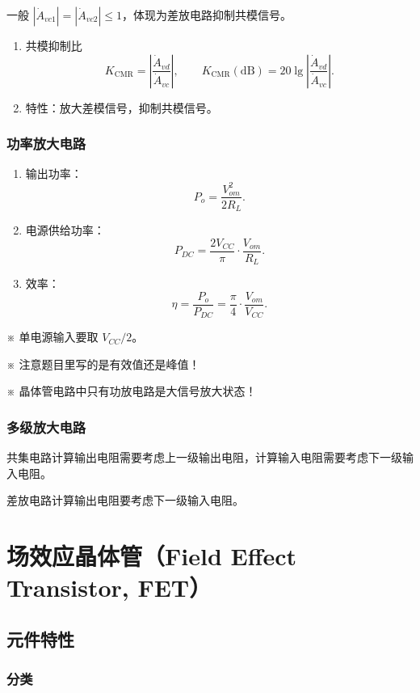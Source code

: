 \documentclass[UTF8,fontset=fandol,zihao=5]{ctexart}
\begin{document}
一般 $|\dot A_{vc1}|=|\dot A_{vc2}|\leq1$，体现为差放电路抑制共模信号。

\begin{enumerate}[resume]
  \item 共模抑制比
  \[
    K_{\mathrm{CMR}}=\left|\frac{\dot A_{vd}}{\dot A_{vc}}\right|,
    \qquad
    K_{\mathrm{CMR}}(\mathrm{dB})=20\lg\left|\frac{\dot A_{vd}}{\dot A_{vc}}\right|.
  \]
  \item 特性：放大差模信号，抑制共模信号。
\end{enumerate}

\subsubsection{功率放大电路}

\begin{enumerate}
  \item 输出功率：
  \[
    P_o=\frac{V_{om}^2}{2R_L}.
  \]
  \item 电源供给功率：
  \[
    P_{DC}=\frac{2V_{CC}}{\pi}\cdot\frac{V_{om}}{R_L}.
  \]
  \item 效率：
  \[
    \eta=\frac{P_o}{P_{DC}}=\frac{\pi}{4}\cdot\frac{V_{om}}{V_{CC}}.
  \]
\end{enumerate}

※ 单电源输入要取 $V_{CC}/2$。

※ 注意题目里写的是有效值还是峰值！

※ 晶体管电路中只有功放电路是大信号放大状态！

\subsubsection{多级放大电路}

共集电路计算输出电阻需要考虑上一级输出电阻，计算输入电阻需要考虑下一级输入电阻。

差放电路计算输出电阻要考虑下一级输入电阻。

\section{场效应晶体管（Field Effect Transistor, FET）}

\subsection{元件特性}

\subsubsection{分类}
\end{document}
